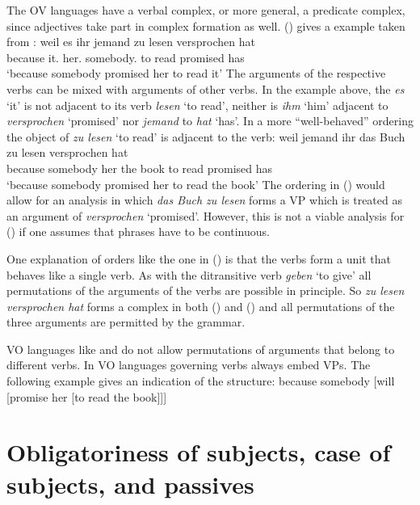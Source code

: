 The   OV languages have a verbal complex, or more general, a predicate complex, since adjectives take
part in complex formation as well. () gives a  example taken from \textcites*[]{Haider86c}[]{Haider90b}:
\ea
\gll weil es ihr jemand zu lesen versprochen hat\\
     because it.\ACC{} her.\DAT{} somebody.\NOM{} to read promised has\\\german
\glt `because somebody promised her to read it'
\z
The arguments of the respective verbs can be mixed with arguments of other verbs. In the example
above, the \emph{es} `it' is not adjacent to its verb \emph{lesen} `to read', neither is \emph{ihm}
`him' adjacent to \emph{versprochen} `promised' nor \emph{jemand} to \emph{hat} `has'. In a more
``well-behaved'' ordering the object of \emph{zu lesen} `to read' is adjacent to the verb:
\ea
\gll weil    jemand   ihr das Buch zu lesen versprochen hat\\
     because somebody her the book to read  promised    has\\
\glt `because somebody promised her to read the book'
\z
The ordering in () would allow for an analysis in which \emph{das Buch zu lesen} forms a VP
which is treated as an argument of \emph{versprochen} `promised'. However, this is not a viable
analysis for () if one assumes that phrases have to be continuous.

One explanation of orders like the one in () is that the verbs form a unit that behaves like a single verb. As with
the ditransitive verb \emph{geben} `to give' all permutations of the arguments of the verbs are
possible in principle. So \emph{zu lesen versprochen hat} forms a complex in both () and
() and all permutations of the three arguments are permitted by the grammar.

VO languages like  and  do not allow permutations of arguments that belong to different
verbs. In VO languages governing verbs always embed VPs. The following example gives an indication of the
structure:
\ea
because somebody [will [promise her [to read the book]]]
\z
{} 


\section{Obligatoriness of subjects, case of subjects, and passives}

